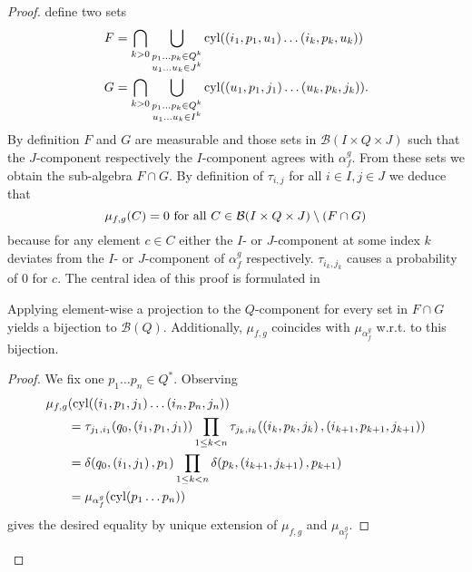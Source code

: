 \begin{proof}
  define two sets
  \begin{align*}
    F &= \bigcap_{k>0}\bigcup_{
      \substack{
        p_{1}\dots p_{k}\in Q^{k}\\
        u_{1}\dots u_{k}\in J^{k}
      }
    }\operatorname{cyl}(\left(i_{1}, p_{1}, u_{1}\right)\dots\left(i_{k}, p_{k}, u_{k}\right))\\
    G &= \bigcap_{k>0}\bigcup_{
      \substack{
        p_{1}\dots p_{k}\in Q^{k}\\
        u_{1}\dots u_{k}\in I^{k}
      }
    }\operatorname{cyl}(\left(u_{1}, p_{1}, j_{1}\right)\dots\left(u_{k}, p_{k}, j_{k}\right)).
  \end{align*}
  By definition $F$ and $G$ are measurable and those sets in
  $\mathcal{B}(I\times Q\times J)$ such that the $J$-component respectively the
  $I$-component agrees with $\alpha_{f}^{g}$. From these sets we obtain the 
  sub-algebra $F\cap G$. By definition of $\tau_{i, j}$ for all $i\in I, 
  j\in J$ we deduce that 
  \begin{equation*}
    \mu_{f,g}(C) = 0\text{ for all }
    C\in \mathcal{B}(I\times Q\times J)\setminus\left(F\cap G\right)
  \end{equation*}
  because for any element $c\in C$ either the $I$- or $J$-component at some 
  index $k$ deviates from the $I$- or $J$-component of $\alpha_{f}^{g}$ 
  respectively. $\tau_{i_{k}, j_{k}}$ causes a probability of $0$ for $c$.
  The central idea of this proof is formulated in
  \begin{lemma}
    Applying element-wise a projection to the $Q$-component for every set in 
    $F\cap G$ yields a bijection to $\mathcal{B}(Q)$. Additionally, $\mu_{f,g}$ 
    coincides with $\mu_{\alpha_{f}^{g}}$ w.r.t. to this bijection.
    \label{lem:fginpba}
  \end{lemma}
  \begin{proof}
    We fix one $p_{1}\dots p_{n}\in Q^{*}$. Observing
    \begin{align*}
      \mu_{f, g}&(
        \operatorname{cyl}(\left(i_{1}, p_{1}, j_{1}\right)\dots\left(i_{n}, p_{n}, j_{n}\right))\\
      &= \tau_{j_{1}, i_{1}}(q_{0}, \left(i_{1}, p_{1}, j_{1}\right))
        \prod\limits_{1\leq k < n}\tau_{j_{k}, i_{k}}(\left(i_{k}, p_{k}, 
          j_{k}\right),\left(i_{k+1}, p_{k+1}, j_{k+1}\right))\\
      &= \delta(q_{0}, \left(i_{1}, j_{1}\right), p_{1})
        \prod\limits_{1\leq k < n}\delta(p_{k}, \left(i_{k+1}, j_{k+1}\right), 
          p_{k+1})\\
      &= \mu_{\alpha_{f}^{g}}(\operatorname{cyl}(p_{1}\dots p_{n}))
    \end{align*}
    gives the desired equality by unique extension of $\mu_{f, g}$ and 
    $\mu_{\alpha_{f}^{g}}$.
  \end{proof}


\end{proof}
